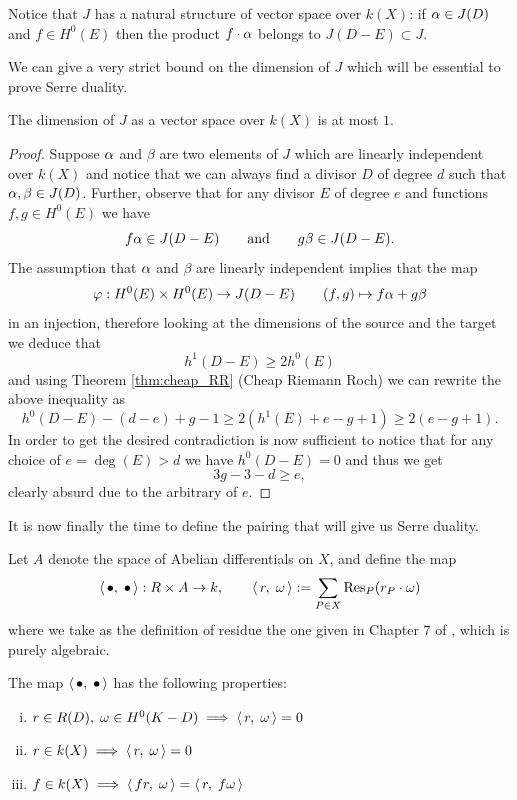 	\begin{rema}
		Notice that $J$ has a natural structure of vector space over $k(X)$: if $\alpha\in J(D)$ and $f\in H^0(E)$ then the product $f\cdot\alpha$ belongs to $J(D-E)\subset J$.
	\end{rema}
	We can give a very strict bound on the dimension of $J$ which will be essential to prove Serre duality. 
	\begin{prop}\label{prop:dim1}
		The dimension of $J$ as a vector space over $k(X)$ is at most $1$.
	\end{prop}
	\begin{proof}
		Suppose $\alpha$ and $\beta$ are two elements of $J$ which are linearly independent over $k(X)$ and notice that we can always find a divisor $D$ of degree $d$ such that $\alpha,\beta \in J(D)$. Further, observe that for any divisor $E$ of degree $e$ and functions $f,g \in H^0(E)$ we have
		$$ f \alpha \in J(D-E) \qquad \text{and} \qquad  g\beta \in J(D-E). $$
		The assumption that $\alpha$ and $\beta$ are linearly independent implies that the map
		$$ \varphi: H^0(E)\times H^0(E) \to J(D-E) \qquad (f,g) \mapsto f\alpha + g\beta $$
		in an injection, therefore looking at the dimensions of the source and the target we deduce that
		$$ h^1(D-E) \geq 2 h^0(E) $$
		and using Theorem \ref{thm:cheap_RR} (Cheap Riemann Roch) we can rewrite the above inequality as
		$$ h^0(D-E)-(d-e) + g - 1 \geq 2(h^1(E)+e-g+1) \geq 2(e-g+1). $$
		In order to get the desired contradiction is now sufficient to notice that for any choice of $e=\deg(E) > d$ we have $h^0(D-E)=0$ and thus we get
		$$ 3g-3-d \geq e, $$
		clearly absurd due to the arbitrary of $e$.
	\end{proof}
	It is now finally the time to define the pairing that will give us Serre duality.
	\begin{defi}
		Let $A$ denote the space of Abelian differentials on $X$, and define the map
		$$ \langle\,\bullet,\;\bullet\,\rangle : R \times A \to k , \qquad \langle\, r,\; \omega \,\rangle := \sum_{P\in X} \operatorname{Res}_P(r_P \cdot \omega) $$
		where we take as the definition of residue the one given in Chapter $7$ of \cite{SERRE}, which is purely algebraic.
	\end{defi}
	\begin{lemm}\label{lemm:pairing_properties}
		The map $\langle\,\bullet,\;\bullet\,\rangle$ has the following properties:
	\begin{enumerate}[(i)]
		\item $ r\in R(D),\; \omega \in H^0(K-D) \implies \langle\, r,\; \omega \,\rangle = 0 $
		\item $ r\in k(X) \implies \langle\, r,\; \omega \,\rangle=0 $
		\item $ f\in k(X) \implies \langle\, fr,\; \omega \,\rangle = \langle\, r,\; f\omega \,\rangle $
	\end{enumerate}
	\end{lemm}
